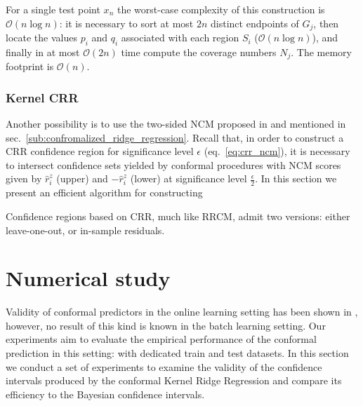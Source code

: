 \documentclass{ITaSconf}
\begin{document}
For a single test point $x_n$ the worst-case complexity of this construction is
$\mathcal{O}(n \log n)$: it is necessary to sort at most $2n$ distinct endpoints
of $G_j$, then locate the values $p_i$ and $q_i$ associated with each region $S_i$
($\mathcal{O}(n\log n)$), and finally in at most $\mathcal{O}(2n)$ time compute
the coverage numbers $N_j$. The memory footprint is $\mathcal{O}(n)$.


\subsubsection{Kernel CRR} %
\label{ssub:kernel_crr}
Another possibility is to use the two-sided NCM proposed in \cite{BurVovk2014} and
mentioned in sec.~\ref{sub:confromalized_ridge_regression}. Recall that, in order
to construct a CRR confidence region for significance level $\epsilon$ (eq.~\ref{eq:crr_ncm}),
it is necessary to intersect confidence sets yielded by conformal procedures with NCM
scores given by $\hat{r}_i^z$ (upper) and $-\hat{r}_i^z$ (lower) at significance level
$\frac{\epsilon}{2}$. In this section we present an efficient algorithm for constructing

Confidence regions based on CRR, much like RRCM, admit two
versions: either leave-one-out, or in-sample residuals.






\section{Numerical study} %
\label{sec:numerical_study}

Validity of conformal predictors in the online learning setting has been shown in
\cite{vovk2005}, however, no result of this kind is known in the batch learning setting.
Our experiments aim to evaluate the empirical performance of the conformal prediction
in this setting: with dedicated train and test datasets. In this section we conduct
a set of experiments to examine the validity of the confidence intervals produced
by the conformal Kernel Ridge Regression and compare its efficiency to the Bayesian
confidence intervals.
\end{document}
